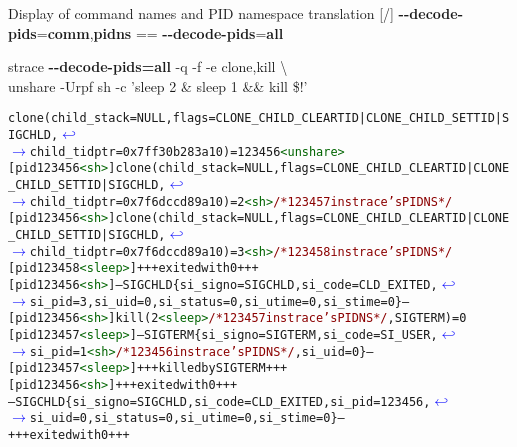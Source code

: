 \documentclass[unicode,aspectratio=169,xcolor={table,dvipsnames,usernames}]{beamer}
\newcommand{\symlinebreak}{\textcolor{blue}{\(\hookleftarrow\)}}
\newcommand{\symlinecont}{\textcolor{blue}{\(\longrightarrow\)}}
\begin{document}
\begin{frame}[fragile]{Display of command names and PID namespace translation \hfill [\insertframenumber/\inserttotalframenumber]}
\large
\textbf{-{}-decode-pids}=\textbf{comm},\textbf{pidns} == \textbf{-{}-decode-pids}=\textbf{all}

\begin{block}{strace \textbf{-{}-decode-pids=all} -q -f -e clone,kill \textbackslash \\ unshare -Urpf sh -c 'sleep 2 \& sleep 1 \&\& kill \$!'}
\scriptsize
\begin{alltt}
clone(child_stack=NULL, flags=CLONE_CHILD_CLEARTID|CLONE_CHILD_SETTID|SIGCHLD, \symlinebreak
\symlinecont child_tidptr=0x7ff30b283a10) = 123456\textcolor{darkgreen}{<unshare>}
[pid 123456\textcolor{darkgreen}{<sh>}] clone(child_stack=NULL, flags=CLONE_CHILD_CLEARTID|CLONE_CHILD_SETTID|SIGCHLD, \symlinebreak
\symlinecont child_tidptr=0x7f6dccd89a10) = 2\textcolor{darkgreen}{<sh>} \textcolor{darkred}{/* 123457 in strace's PID NS */}
[pid 123456\textcolor{darkgreen}{<sh>}] clone(child_stack=NULL, flags=CLONE_CHILD_CLEARTID|CLONE_CHILD_SETTID|SIGCHLD, \symlinebreak
\symlinecont child_tidptr=0x7f6dccd89a10) = 3\textcolor{darkgreen}{<sh>} \textcolor{darkred}{/* 123458 in strace's PID NS */}
[pid 123458\textcolor{darkgreen}{<sleep>}] +++ exited with 0 +++
[pid 123456\textcolor{darkgreen}{<sh>}] --- SIGCHLD \{si_signo=SIGCHLD, si_code=CLD_EXITED, \symlinebreak
\symlinecont si_pid=3, si_uid=0, si_status=0, si_utime=0, si_stime=0\} ---
[pid 123456\textcolor{darkgreen}{<sh>}] kill(2\textcolor{darkgreen}{<sleep>} \textcolor{darkred}{/* 123457 in strace's PID NS */}, SIGTERM) = 0
[pid 123457\textcolor{darkgreen}{<sleep>}] --- SIGTERM \{si_signo=SIGTERM, si_code=SI_USER, \symlinebreak
\symlinecont si_pid=1\textcolor{darkgreen}{<sh>} \textcolor{darkred}{/* 123456 in strace's PID NS */}, si_uid=0\} ---
[pid 123457\textcolor{darkgreen}{<sleep>}] +++ killed by SIGTERM +++
[pid 123456\textcolor{darkgreen}{<sh>}] +++ exited with 0 +++
--- SIGCHLD \{si_signo=SIGCHLD, si_code=CLD_EXITED, si_pid=123456, \symlinebreak
\symlinecont si_uid=0, si_status=0, si_utime=0, si_stime=0\} ---
+++ exited with 0 +++
\end{alltt}
\end{block}
\end{frame}
\end{document}
